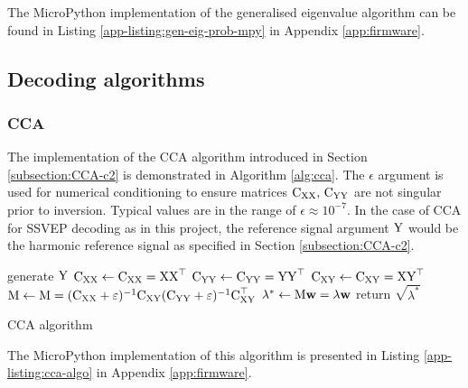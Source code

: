 The MicroPython implementation of the generalised eigenvalue algorithm can be found in Listing \ref{app-listing:gen-eig-prob-mpy} in Appendix \ref{app:firmware}.

\subsection{Decoding algorithms}
\subsubsection{CCA}
The implementation of the CCA algorithm introduced in Section \ref{subsection:CCA-c2} is demonstrated in Algorithm \ref{alg:cca}. The $\epsilon$ argument is used for numerical conditioning to ensure matrices ${\textrm{C}}_{{\textrm{X}}{\textrm{X}}}, \, {\textrm{C}}_{{\textrm{Y}}{\textrm{Y}}}$ are not singular prior to inversion. Typical values are in the range of $\epsilon\approx10^{-7}$. In the case of CCA for SSVEP decoding as in this project, the reference signal argument ${\textrm{Y}}$ would be the harmonic reference signal as specified in Section \ref{subsection:CCA-c2}.

\begin{algorithm}
\begin{algorithmic}[1]
 
\State generate ${\textrm{Y}}$ 
\State ${\textrm{C}}_{{\textrm{X}}{\textrm{X}}} \gets {\textrm{C}}_{{\textrm{X}}{\textrm{X}}} = {\textrm{X}}{\textrm{X}}^\top$ 
\State ${\textrm{C}}_{{\textrm{Y}}{\textrm{Y}}} \gets {\textrm{C}}_{{\textrm{Y}}{\textrm{Y}}} = {\textrm{Y}}{\textrm{Y}}^\top$ 
\State ${\textrm{C}}_{{\textrm{X}}{\textrm{Y}}} \gets {\textrm{C}}_{{\textrm{X}}{\textrm{Y}}} = {\textrm{X}}{\textrm{Y}}^\top$ 
\State ${\textrm{M}} \gets {\textrm{M}} = ({\textrm{C}}_{{\textrm{X}}{\textrm{X}}}+\varepsilon)^{-1}{\textrm{C}}_{{\textrm{X}}{\textrm{Y}}}({\textrm{C}}_{{\textrm{Y}}{\textrm{Y}}}+\varepsilon)^{-1}{\textrm{C}}_{{\textrm{X}}{\textrm{Y}}}^\top$ 
\State $\lambda^* \gets {\textrm{M}}{\mathbf{w}} = \lambda{\mathbf{w}}$ 
\State return $\sqrt{\lambda^*}$ 
\EndFunction
\end{algorithmic}
\caption{CCA algorithm}
\label{alg:cca}
\end{algorithm}
The MicroPython implementation of this algorithm is presented in Listing \ref{app-listing:cca-algo} in Appendix \ref{app:firmware}.

